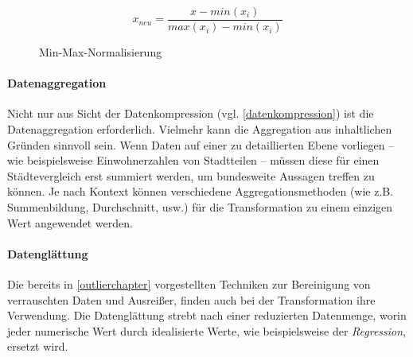 \begin{figure}[H]
\begin{equation}
x_{neu} = \frac{x - min(x_i)}{max(x_i) - min(x_i)}
\end{equation}
\caption{Min-Max-Normalisierung}
\label{minmax}
\end{figure}

\paragraph{Datenaggregation}
Nicht nur aus Sicht der Datenkompression (vgl. \vref{datenkompression}) ist die Datenaggregation erforderlich. Vielmehr \glqq kann die Aggregation aus inhaltlichen Gründen sinnvoll sein.\grqq{} Wenn Daten auf einer zu detaillierten Ebene vorliegen -- wie beispielsweise Einwohnerzahlen von Stadtteilen -- müssen diese für einen Städtevergleich erst summiert werden, um bundesweite Aussagen treffen zu können. Je nach Kontext können verschiedene Aggregationsmethoden (wie z.B. Summenbildung, Durchschnitt, usw.) für die Transformation zu einem einzigen Wert angewendet werden.

\paragraph{Datenglättung}
Die bereits in \vref{outlierchapter} vorgestellten Techniken zur Bereinigung von verrauschten Daten und Ausreißer, finden auch bei der Transformation ihre Verwendung. Die Datenglättung strebt nach einer reduzierten Datenmenge, worin jeder numerische Wert durch idealisierte Werte, wie beispielsweise der \textit{Regression}, ersetzt wird.